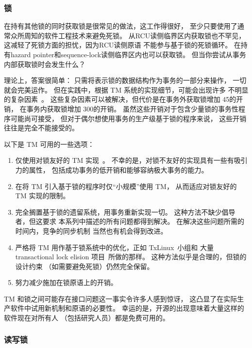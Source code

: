 \subsubsection{锁}
\label{sec:future:Locking}

在持有其他锁的同时获取锁是很常见的做法，这工作得很好，
至少只要使用了通常众所周知的软件工程技术来避免死锁。
从RCU读侧临界区内获取锁也不罕见，
这减轻了死锁方面的担忧，因为RCU读侧原语
不能参与基于锁的死锁循环。
在持有hazard pointer和sequence-lock读侧临界区内也可以获取锁。
但当你尝试从事务内部获取锁时会发生什么？

理论上，答案很简单：
只需将表示锁的数据结构作为事务的一部分来操作，
一切就会完美运作。
但在实践中，根据 TM 系统的实现细节，可能会出现许多
不明显的复杂因素~\cite{Volos2008TRANSACT}。
这些复杂因素可以被解决，但代价是在事务外获取锁增加 45\pct 的开销，
在事务内获取锁增加 300\pct 的开销。
虽然这些开销对于包含少量锁的事务性程序可能尚可接受，
但对于偶尔想使用事务的生产级基于锁的程序来说，
这些开销往往是完全不能接受的。

以下是 TM 可用的一些选项：

\begin{enumerate}
\item	仅使用对锁友好的 TM 实现~\cite{DaveDice2006DISC}。
	不幸的是，对锁不友好的实现具有一些有吸引力的属性，
	包括成功事务的低开销和能够容纳极大事务的能力。
\item	在将 TM 引入基于锁的程序时仅``小规模''使用 TM，
	从而适应对锁友好的 TM 实现的限制。
\item	完全搁置基于锁的遗留系统，用事务重新实现一切。
	这种方法不缺少倡导者，但这要求
	本系列中描述的所有问题都得到解决。
	在解决这些问题所需的时间内，竞争的同步机制
	当然也有机会得到改进。
\item	严格将 TM 用作基于锁系统中的优化，正如
	TxLinux~\cite{ChistopherJRossbach2007a}小组和
	大量transactional lock elision
	项目~\cite{MartinPohlack2011HTM2TLE,Kleen:2014:SEL:2566590.2576793,PascalFelber2016rwlockElision,SeongJaePark2020HTMRCUlock}所做的那样。
	这种方法似乎是合理的，但锁的设计约束
	（如需要避免死锁）仍然完全保留。
\item	努力减少施加在锁原语上的开销。
\end{enumerate}

TM 和锁之间可能存在接口问题这一事实令许多人感到惊讶，
这凸显了在实际生产软件中试用新机制和原语的必要性。
幸运的是，开源的出现意味着大量这样的软件现在对所有人
（包括研究人员）都是免费可用的。

\subsubsection{读写锁}
\label{sec:future:Reader-Writer Locking}

